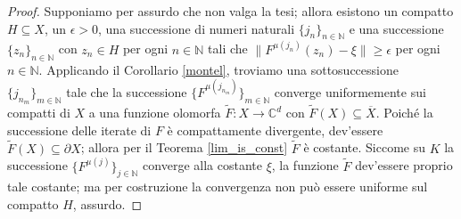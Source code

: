 \begin{proof}
    Supponiamo per assurdo che non valga la tesi; allora esistono un compatto $H\subseteq X$, un $\epsilon>0$, una successione di numeri naturali $\{j_n\}_{n\in\mathbb{N}}$ e una successione $\{z_n\}_{n\in\mathbb{N}}$ con $z_n\in H$ per ogni $n\in\mathbb{N}$ tali che $\|F^{\mu(j_n)}(z_n)-\xi\|\ge\epsilon$ per ogni $n\in\mathbb{N}$. Applicando il Corollario \ref{montel}, troviamo una sottosuccessione $\{j_{n_m}\}_{m\in\mathbb{N}}$ tale che la successione $\{F^{\mu(j_{n_m})}\}_{m\in\mathbb{N}}$ converge uniformemente sui compatti di $X$ a una funzione olomorfa $\tilde{F}:X \rightarrow \mathbb{C}^d$ con $\tilde{F}(X)\subseteq\overline{X}$. Poiché la successione delle iterate di $F$ è compattamente divergente, dev'essere $\tilde{F}(X)\subseteq\partial X$; allora per il Teorema \ref{lim_is_const} $\tilde{F}$ è costante. Siccome su $K$ la successione $\{F^{\mu(j)}\}_{j\in\mathbb{N}}$ converge alla costante $\xi$, la funzione $\tilde{F}$ dev'essere proprio tale costante; ma per costruzione la convergenza non può essere uniforme sul compatto $H$, assurdo.
\end{proof}